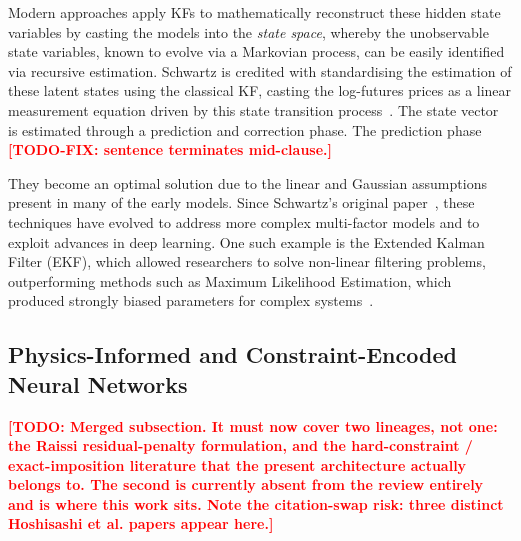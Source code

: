 \documentclass[11pt, a4paper]{article}
\newcommand{\todo}[1]{\textcolor{red}{\textbf{[TODO: #1]}}}
\begin{document}
Modern approaches apply KFs to mathematically reconstruct these hidden state variables by casting the models into the \textit{state space}, whereby the unobservable state variables, known to evolve via a Markovian process, can be easily identified~\cite{Schwartz1997TheHedging} via recursive estimation. Schwartz is credited with standardising the estimation of these latent states using the classical KF, casting the log-futures prices as a linear measurement equation driven by this state transition process~\cite{Schwartz1997TheHedging}. The state vector is estimated through a prediction and correction phase. The prediction phase \textcolor{red}{\textbf{[TODO-FIX: sentence terminates mid-clause.]}}

They become an optimal solution due to the linear and Gaussian assumptions present in many of the early models. Since Schwartz's original paper~\cite{Schwartz1997TheHedging}, these techniques have evolved to address more complex multi-factor models and to exploit advances in deep learning. One such example is the Extended Kalman Filter (EKF), which allowed researchers to solve non-linear filtering problems, outperforming methods such as Maximum Likelihood Estimation, which produced strongly biased parameters for complex systems~\cite{Liu2009No-ArbitrageStructures}.



\subsection{Physics-Informed and Constraint-Encoded Neural Networks}
\label{sec:lit_pinns}
\label{sec:lit_wamol}
\todo{Merged subsection. It must now cover two lineages, not one: the Raissi
  residual-penalty formulation, and the hard-constraint / exact-imposition
  literature that the present architecture actually belongs to. The second is
  currently absent from the review entirely and is where this work sits. Note
  the citation-swap risk: three distinct Hoshisashi et al. papers appear here.}
\end{document}

